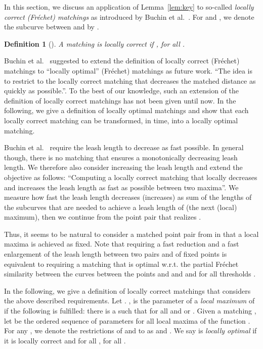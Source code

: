 \documentclass[a4paper,11pt]{article}
\newtheorem{definition}{Definition}
\begin{document}
In this section, we discuss an application of Lemma~\ref{lem:key} to so-called \emph{locally correct (Fr\'{e}chet) matchings} as introduced by Buchin et al.~\cite{buchin:locally}. For  and , we denote the subcurve between  and  by .
\begin{definition}[\cite{buchin:locally}]\label{def:correct}
	A matching  is \emph{locally correct} if 
	, for all .
\end{definition}

	Buchin et al.~\cite{buchin:locally} suggested to extend the definition of locally correct (Fr\'{e}chet) matchings to ``locally optimal'' (Fr\'{e}chet) matchings as future work. ``The idea is to restrict to the locally correct matching that decreases the matched distance as quickly as possible.''\cite[p. 237]{buchin:locally}. To the best of our knowledge, such an extension of the definition of locally correct matchings has not been given until now. In the following, we give a definition of locally optimal matchings and show that each locally correct matching 
can be transformed, in  time, into a locally optimal matching.
	
	Buchin et al.~\cite{buchin:locally} require the leash length to decrease as fast possible. In general though, there is no matching that ensures a monotonically decreasing leash length. We therefore also consider increasing the leash length and extend the objective as follows: ``Computing a locally correct matching that locally decreases and increases the leash length as fast as possible between two maxima''. We measure how fast the leash length decreases (increases) as sum of the lengths of the subcurves that are needed to achieve a leash length of  (the next (local) maximum), then we continue from the point pair that realizes .
	
	 Thus, it seems to be natural to consider a matched point pair from  in that a local maxima is achieved as fixed. Note that requiring a fast reduction and a fast enlargement of the leash length between two pairs  and  of fixed points is equivalent to requiring a matching that is optimal w.r.t. the partial Fr\'{e}chet similarity between the curves between the points  and  and  and  for all thresholds . 
	 
	 In the following, we give a definition of locally correct matchings that considers the above described requirements.
	Let . , is the parameter of a \emph{local maximum} of  if the following is fulfilled: there is a  such that for all  and  or . 
	Given a matching , let  be the ordered sequence of parameters for all local maxima of the function . For any , we denote the restrictions of  and  to  as  and .
	We say  is \emph{locally optimal} if it is locally correct and for all ,  for all .
	
\end{document}
